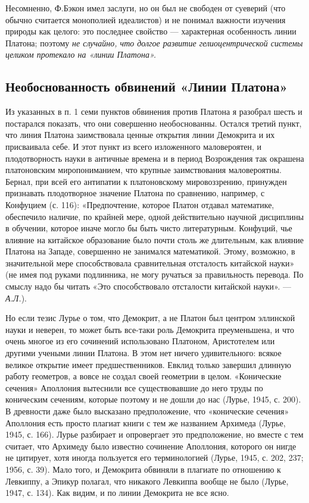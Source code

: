 Несомненно, Ф.Бэкон  имел заслуги, но  он был не свободен  от суеверий
(что  обычно считается  монополией идеалистов)  и не  понимал важности
изучения природы  как целого:  это последнее свойство  --- характерная
особенность  линии  Платона;  поэтому \emph{не  случайно,  что  долгое
развитие  гелиоцентрической   системы  целиком  протекало   на  «линии
Платона».}

\subsection{Необоснованность обвинений «Линии Платона»}

Из указанных в  п. 1 семи пунктов обвинения против  Платона я разобрал
шесть  и  постарался  показать,   что  они  совершенно  необоснованны.
Остался третий  пункт, что линия Платона  заимствовала ценные открытия
линии  Демокрита  и  их  присваивала  себе.  И  этот  пункт  из  всего
изложенного маловероятен, и плодотворность  науки в античные времена и
в  период Возрождения  так окрашена  платоновским миропониманием,  что
крупные  заимствования маловероятны.  Бернал, при  всей его  антипатии
к  платоновскому  мировоззрению,   принужден  признавать  плодотворное
значение  Платона  по  сравнению,  например,  с  Конфуцием  (с.  116):
«Предпочтение, которое Платон  отдавал математике, обеспечило наличие,
по крайней  мере, одной  действительно научной дисциплины  в обучении,
которое иначе могло бы быть  чисто литературным. Конфуций, чье влияние
на китайское образование  было почти столь же  длительным, как влияние
Платона  на  Западе,  совершенно   не  занимался  математикой.  Этому,
возможно, в значительной  мере способствовала сравнительная отсталость
китайской науки» (не  имея под руками подлинника, не  могу ручаться за
правильность перевода.  По смыслу  надо бы читать  «Это способствовало
отсталости китайской науки». --- \emph{А.Л.}).

Но  если тезис  Лурье о  том, что  Демокрит, а  не Платон  был центром
эллинской  науки и  неверен,  то может  быть  все-таки роль  Демокрита
преуменьшена,  и  что  очень  многое  из  его  сочинений  использовано
Платоном, Аристотелем  или другими учеными  линии Платона. В  этом нет
ничего удивительного: всякое  великое открытие имеет предшественников.
Евклид только  завершил длинную  работу геометров,  а вовсе  не создал
своей геометрии в целом.  «Конические сечения» Аполлония вытеснили все
существовавшие до него труды по коническим сечениям, которые поэтому и
не дошли до нас (Лурье, 1945, с. 200). В древности даже было высказано
предположение, что «конические сечения»  Аполлония есть просто плагиат
книги  с  тем же  названием  Архимеда  (Лурье,  1945, с.  166).  Лурье
разбирает и  опровергает это предположение,  но вместе с  тем считает,
что Архимеду было  известно сочинение Аполлония, которого  он нигде не
цитирует, хотя  иногда пользуется  его терминологией (Лурье,  1945, с.
202, 237; 1956, с. 39). Мало  того, и Демокрита обвиняли в плагиате по
отношению к Левкиппу,  а Эпикур полагал, что  никакого Левкиппа вообще
не было (Лурье, 1947, с. 134). Как  видим, и по линии Демокрита не все
ясно.

